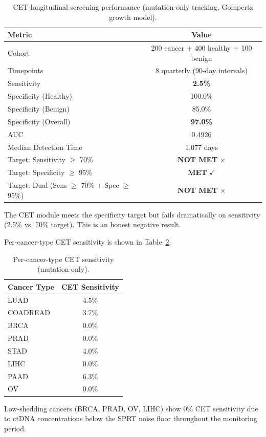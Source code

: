 \documentclass[10pt,a4paper]{article}
\begin{document}
\begin{table}[H]
\centering
\caption{CET longitudinal screening performance (mutation-only tracking, Gompertz growth model).}
\label{tab:cet_performance}
\begin{tabular}{l c}
\toprule
\textbf{Metric} & \textbf{Value} \\
\midrule
Cohort & 200 cancer + 400 healthy + 100 benign \\
Timepoints & 8 quarterly (90-day intervals) \\
Sensitivity & \textbf{2.5\%} \\
Specificity (Healthy) & 100.0\% \\
Specificity (Benign) & 85.0\% \\
Specificity (Overall) & \textbf{97.0\%} \\
AUC & 0.4926 \\
Median Detection Time & 1,077 days \\
\hline
Target: Sensitivity $\geq$ 70\% & \textbf{NOT MET} $\times$ \\
Target: Specificity $\geq$ 95\% & \textbf{MET} $\checkmark$ \\
Target: Dual (Sens $\geq$ 70\% + Spec $\geq$ 95\%) & \textbf{NOT MET} $\times$ \\
\bottomrule
\end{tabular}
\vspace{0.3cm}
\footnotesize{The CET module meets the specificity target but fails dramatically on sensitivity (2.5\% vs. 70\% target). This is an honest negative result.}
\end{table}

Per-cancer-type CET sensitivity is shown in Table~\ref{tab:cet_per_cancer}:

\begin{table}[H]
\centering
\caption{Per-cancer-type CET sensitivity (mutation-only).}
\label{tab:cet_per_cancer}
\begin{tabular}{l c}
\toprule
\textbf{Cancer Type} & \textbf{CET Sensitivity} \\
\midrule
LUAD & 4.5\% \\
COADREAD & 3.7\% \\
BRCA & 0.0\% \\
PRAD & 0.0\% \\
STAD & 4.0\% \\
LIHC & 0.0\% \\
PAAD & 6.3\% \\
OV & 0.0\% \\
\bottomrule
\end{tabular}
\vspace{0.3cm}
\footnotesize{Low-shedding cancers (BRCA, PRAD, OV, LIHC) show 0\% CET sensitivity due to ctDNA concentrations below the SPRT noise floor throughout the monitoring period.}
\end{table}
\end{document}

